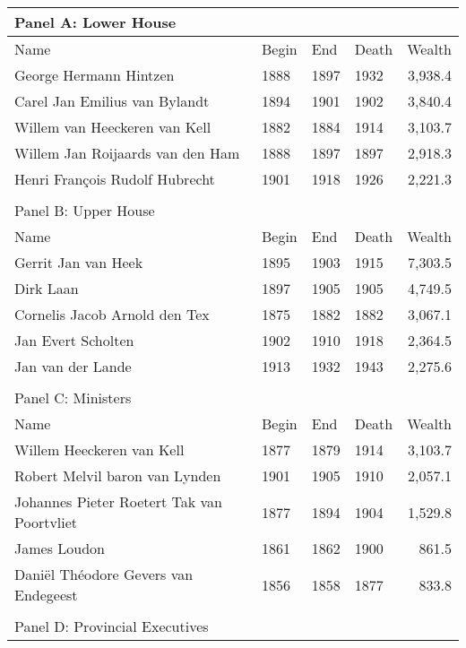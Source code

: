 \begin{table}[ht]
\centering
\begin{tabular}{llllr}

\multicolumn{5}{l}{Panel A: Lower House}\\
\hline
Name & Begin & End & Death & Wealth \\\hline

George Hermann Hintzen & 1888 & 1897 & 1932 & 3,938.4 \\
  Carel Jan Emilius van Bylandt & 1894 & 1901 & 1902 & 3,840.4 \\
  Willem van Heeckeren van Kell & 1882 & 1884 & 1914 & 3,103.7 \\
  Willem Jan Roijaards van den Ham & 1888 & 1897 & 1897 & 2,918.3 \\
  Henri François Rudolf Hubrecht & 1901 & 1918 & 1926 & 2,221.3 \\
   \hline\\
\multicolumn{5}{l}{Panel B: Upper House}\\
\hline
Name & Begin & End & Death & Wealth \\\hline
Gerrit Jan van Heek & 1895 & 1903 & 1915 & 7,303.5 \\
  Dirk Laan & 1897 & 1905 & 1905 & 4,749.5 \\
  Cornelis Jacob Arnold den Tex & 1875 & 1882 & 1882 & 3,067.1 \\
  Jan Evert Scholten & 1902 & 1910 & 1918 & 2,364.5 \\
  Jan van der Lande & 1913 & 1932 & 1943 & 2,275.6 \\
   \hline\\
\multicolumn{5}{l}{Panel C: Ministers}\\
\hline
Name & Begin & End & Death & Wealth \\\hline
Willem Heeckeren van Kell & 1877 & 1879 & 1914 & 3,103.7 \\
  Robert Melvil baron van Lynden & 1901 & 1905 & 1910 & 2,057.1 \\
  Johannes Pieter Roetert Tak van Poortvliet & 1877 & 1894 & 1904 & 1,529.8 \\
  James Loudon & 1861 & 1862 & 1900 & 861.5 \\
  Daniël Théodore Gevers van Endegeest & 1856 & 1858 & 1877 & 833.8 \\
   \hline\\
\multicolumn{5}{l}{Panel D: Provincial Executives}\\
\hline

\end{tabular}
\end{table}
